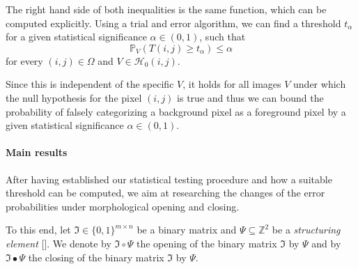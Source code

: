 \documentclass[a4paper,12pt]{article}
\theoremstyle{plain}
\theoremstyle{definition}
\begin{document}
The right hand side of both inequalities is the same function, which can be computed explicitly. Using a trial and error algorithm, we can find a threshold $t_\alpha$ for a given statistical significance $\alpha \in ( 0, 1 )$, such that
\begin{equation*}
	\mathbb{P}_V( T(i, j) \geq t_\alpha ) \leq \alpha
\end{equation*}
for every $(i, j) \in \Omega$ and $V \in \mathcal{H}_0(i, j)$.

Since this is independent of the specific $V$, it holds for all images $V$ under which the null hypothesis for the pixel $(i, j)$ is true and thus we can bound the probability of falsely categorizing a background pixel as a foreground pixel by a given statistical significance $\alpha \in ( 0, 1 )$.

\paragraph{Main results}

After having established our statistical testing procedure and how a suitable threshold can be computed, we aim at researching the changes of the error probabilities under morphological opening and closing.

To this end, let $\mathfrak{I} \in \{ 0, 1 \}^{m \times n}$ be a binary matrix and $\Psi \subseteq \mathbb{Z}^2$ be a \emph{structuring element} []. We denote by $\mathfrak{I} \circ \Psi$ the opening of the binary matrix $\mathfrak{I}$ by $\Psi$ and by $\mathfrak{I} \bullet \Psi$ the closing of the binary matrix $\mathfrak{I}$ by $\Psi$.
\end{document}
